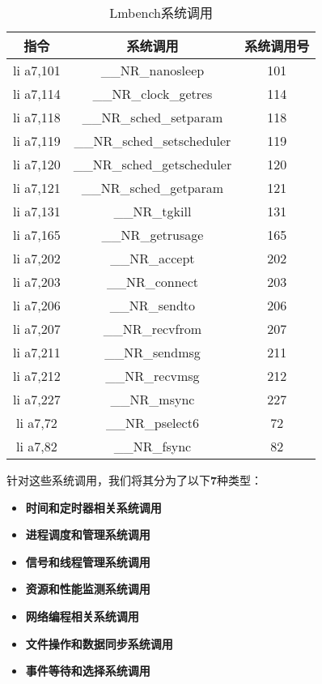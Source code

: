 \begin{table}[h]
\centering
\begin{tabular}{|c|c|c|}
\hline
\textbf{指令} & \textbf{系统调用} & \textbf{系统调用号} \\
\hline
li a7,101 & \_\_NR\_nanosleep & 101 \\
\hline
li a7,114 & \_\_NR\_clock\_getres & 114 \\
\hline
li a7,118 & \_\_NR\_sched\_setparam & 118 \\
\hline
li a7,119 & \_\_NR\_sched\_setscheduler & 119 \\
\hline
li a7,120 & \_\_NR\_sched\_getscheduler & 120 \\
\hline
li a7,121 & \_\_NR\_sched\_getparam & 121 \\
\hline
li a7,131 & \_\_NR\_tgkill & 131 \\
\hline
li a7,165 & \_\_NR\_getrusage & 165 \\
\hline
li a7,202 & \_\_NR\_accept & 202 \\
\hline
li a7,203 & \_\_NR\_connect & 203 \\
\hline
li a7,206 & \_\_NR\_sendto & 206 \\
\hline
li a7,207 & \_\_NR\_recvfrom & 207 \\
\hline
li a7,211 & \_\_NR\_sendmsg & 211 \\
\hline
li a7,212 & \_\_NR\_recvmsg & 212 \\
\hline
li a7,227 & \_\_NR\_msync & 227 \\
\hline
li a7,72 & \_\_NR\_pselect6 & 72 \\
\hline
li a7,82 & \_\_NR\_fsync & 82 \\
\hline
\end{tabular}
\caption{Lmbench系统调用}
\label{table:syscalls_compact}
\end{table}

针对这些系统调用，我们将其分为了以下\textbf{7}种类型：

\begin{itemize}
    \item \textbf{时间和定时器相关系统调用}

    \item \textbf{进程调度和管理系统调用}

    \item \textbf{信号和线程管理系统调用}

    \item \textbf{资源和性能监测系统调用}

    \item \textbf{网络编程相关系统调用}

    \item \textbf{文件操作和数据同步系统调用}

    \item \textbf{事件等待和选择系统调用}
\end{itemize}


